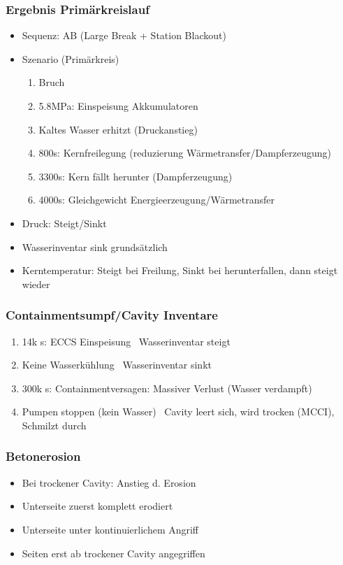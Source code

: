 \documentclass[12pt]{article}
\begin{document}
\subsubsection{Ergebnis Primärkreislauf}
\begin{itemize}
	\item Sequenz: AB (Large Break + Station Blackout)
	\item Szenario (Primärkreis)
		\begin{enumerate}
			\item Bruch
			\item 5.8MPa: Einspeisung Akkumulatoren
			\item Kaltes Wasser erhitzt (Druckanstieg)
			\item 800s: Kernfreilegung (reduzierung Wärmetransfer/Dampferzeugung)
			\item 3300s: Kern fällt herunter (Dampferzeugung)
			\item 4000s: Gleichgewicht Energieerzeugung/Wärmetransfer
		\end{enumerate}
	\item Druck: Steigt/Sinkt
	\item Wasserinventar sink grundsätzlich
	\item Kerntemperatur: Steigt bei Freilung, Sinkt bei herunterfallen, dann steigt wieder
\end{itemize}

\subsubsection{Containmentsumpf/Cavity Inventare}
\begin{enumerate}
	\item 14k s: ECCS Einspeisung \textrightarrow\ Wasserinventar steigt
	\item Keine Wasserkühlung \textrightarrow\ Wasserinventar sinkt
	\item 300k s: Containmentversagen: Massiver Verlust (Wasser verdampft)
	\item Pumpen stoppen (kein Wasser) \textrightarrow\ Cavity leert sich, wird trocken (MCCI), Schmilzt durch
\end{enumerate}

\subsubsection{Betonerosion}
\begin{itemize}
	\item Bei trockener Cavity: Anstieg d. Erosion
	\item Unterseite zuerst komplett erodiert
	\item Unterseite unter kontinuierlichem Angriff
	\item Seiten erst ab trockener Cavity angegriffen
\end{itemize}
\end{document}
